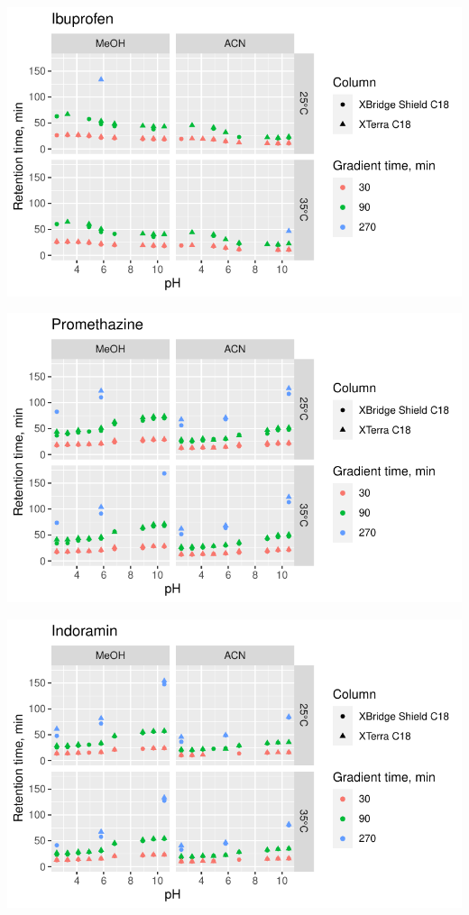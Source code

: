 \documentclass[
  letterpaper,
  DIV=11,
  numbers=noendperiod]{scrreprt}
\begin{document}
\includegraphics{index_files/figure-pdf/unnamed-chunk-4-45.pdf}

\includegraphics{index_files/figure-pdf/unnamed-chunk-4-46.pdf}

\includegraphics{index_files/figure-pdf/unnamed-chunk-4-47.pdf}
\end{document}
